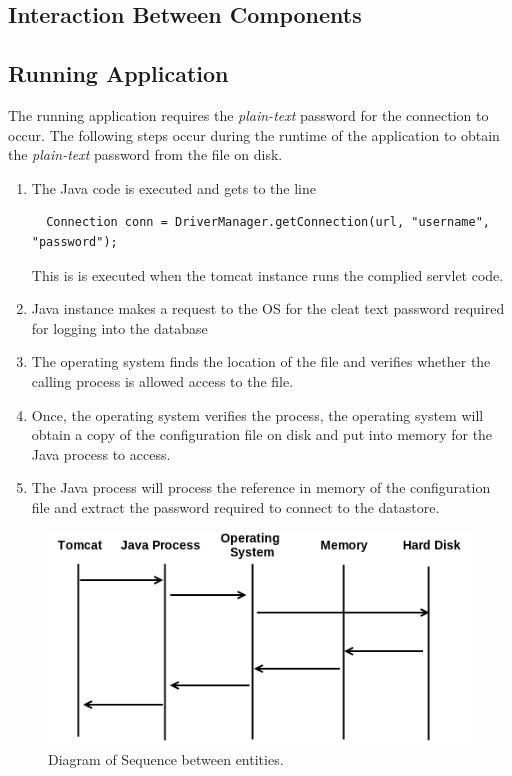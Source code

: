 \documentclass[11pt, a4paper, notitlepage]{article}
\begin{document}
\subsection*{Interaction Between Components}
\subsection*{Running Application}
The running application requires the \emph{plain-text} password for the connection to occur. The following steps occur during the runtime of the application to obtain the \emph{plain-text} password from the file on disk. 

\begin{enumerate}
\item The Java code is executed and gets to the line
\begin{lstlisting}
  Connection conn = DriverManager.getConnection(url, "username", "password");
\end{lstlisting}
This is is executed when the tomcat instance runs the complied servlet code.
\item Java instance makes a request to the OS for the cleat text password required for logging into the database
\item The operating system finds the location of the file and verifies whether the calling process is allowed access to the file.
\item Once, the operating system verifies the process, the operating system will obtain a copy of the configuration file on disk and put into memory for the Java process to access.
\item The Java process will process the reference in memory of the configuration file and extract the password required to connect to the datastore.
\end{enumerate}

\begin{figure}[h!]
    \centering
    \includegraphics[height=0.2\paperheight]{sequence_diagram}
    \caption{Diagram of Sequence between entities.}
\end{figure}
\end{document}
